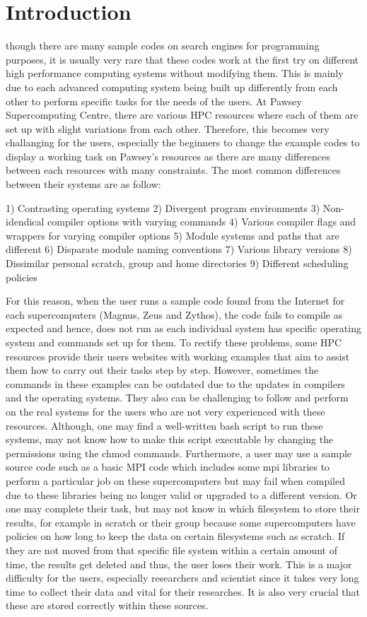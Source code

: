 \documentclass[journal]{IEEEtran}
\begin{document}
\section{Introduction}

 though there are many sample codes on search engines for programming purposes, it is usually very rare that these codes work at 
the first try on different high performance computing systems without modifying them. This is mainly due to each advanced computing system being built 
up differently from each other to perform specific tasks for the needs of the users. At Pawsey Supercomputing Centre, there are various HPC resources 
where each of them are set up with slight variations from each other. Therefore, this becomes very challanging for the users, especially the beginners 
to change the example codes to display a working task on Pawsey's resources as there are many differences between each resources with many constraints. 
The most common differences between their systems are as follow:

1) Contrasting operating systems 
2) Divergent program environments
3) Non-idendical compiler options with varying commands
4) Various compiler flags and wrappers for varying compiler options
5) Module systems and paths that are different
6) Disparate module naming conventions
7) Various library versions
8) Dissimilar personal scratch, group and home directories
9) Different scheduling policies

For this reason, when the user runs a sample code found from the Internet for each supercomputers (Magnus, Zeus and Zythos), the code fails to compile 
as expected and hence, does not run as each individual system has specific operating system and commands set up for them. To rectify these problems, 
some HPC resources provide their users websites with working examples that aim to assist them how to carry out their tasks step by step. 
However, sometimes the commands in these examples can be outdated due to the updates in compilers and the operating systems. They also can be challenging 
to follow and perform on the real systems for the users who are not very experienced with these resources. Although, one may find a well-written bash 
script to run these systems, may not know how to make this script executable by changing the permissions using the chmod commands. Furthermore, a user 
may use a sample source code such as a basic MPI code which includes some mpi libraries to perform a particular job on these supercomputers but may 
fail when compiled due to these libraries being no longer valid or upgraded to a different version. Or one may complete their task, but may 
not know in which filesystem to store their results, for example in scratch or their group because some supercomputers have policies on how long to keep 
the data on certain filesystems such as scratch. If they are not moved from that specific file system within a certain amount of time, the results get 
deleted and thus, the user loses their work. This is a major difficulty for the users, especially researchers and scientist since it takes very long time 
to collect their data and vital for their researches. It is also very crucial that these are stored correctly within these sources.
\end{document}
